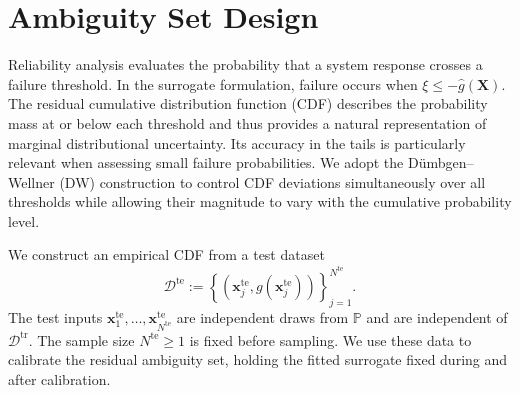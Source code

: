\documentclass[review,11pt,3p,authoryear,nopreprintline]{elsarticle}
\begin{document}
\section{Ambiguity Set Design}
\label{sec-ambiguity-set}

Reliability analysis evaluates the probability that a system response crosses a failure threshold. In the surrogate formulation, failure occurs when $\xi\le-\hat g(\bm X)$. The residual cumulative distribution function (CDF) describes the probability mass at or below each threshold and thus provides a natural representation of marginal distributional uncertainty. Its accuracy in the tails is particularly relevant when assessing small failure probabilities. We adopt the D\"umbgen--Wellner (DW) construction \citep{L.J23} to control CDF deviations simultaneously over all thresholds while allowing their magnitude to vary with the cumulative probability level.

We construct an empirical CDF from a test dataset
\[
  \mathcal D^{\mathrm{te}}:=\left\{\left(\bm x_j^{\mathrm{te}},g(\bm x_j^{\mathrm{te}})\right)\right\}_{j=1}^{N^{\mathrm{te}}}.
\]
The test inputs $\bm x_1^{\mathrm{te}},\ldots,\bm x_{N^{\mathrm{te}}}^{\mathrm{te}}$ are independent draws from $\mathbb P$ and are independent of $\mathcal D^{\mathrm{tr}}$. The sample size $N^{\mathrm{te}}\ge1$ is fixed before sampling. We use these data to calibrate the residual ambiguity set, holding the fitted surrogate fixed during and after calibration.
\end{document}
